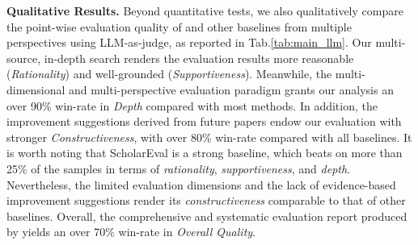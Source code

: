 \textbf{Qualitative Results.}
Beyond quantitative tests, we also qualitatively compare the point-wise evaluation quality of {\ours} and other baselines from multiple perspectives using LLM-as-judge, as reported in Tab.\ref{tab:main_llm}.
Our multi-source, in-depth search renders the evaluation results more reasonable (\textit{Rationality}) and well-grounded (\textit{Supportiveness}).
Meanwhile, the multi-dimensional and multi-perspective evaluation paradigm grants our analysis an over 90\% win-rate in \textit{Depth} compared with most methods.
In addition, the improvement suggestions derived from future papers endow our evaluation with stronger \textit{Constructiveness}, with over 80\% win-rate compared with all baselines.
It is worth noting that ScholarEval is a strong baseline, which beats {\ours} on more than 25\% of the samples in terms of \textit{rationality}, \textit{supportiveness}, and \textit{depth}.
Nevertheless, the limited evaluation dimensions and the lack of evidence-based improvement suggestions render its \textit{constructiveness} comparable to that of other baselines.
Overall, the comprehensive and systematic evaluation report produced by {\ours} yields an over 70\% win-rate in \textit{Overall Quality}.

